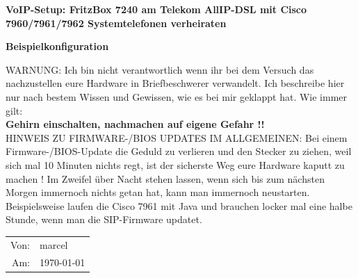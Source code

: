 \documentclass[a4paper,12pt]{scrbook}
\begin{document}
\begin{titlepage}

\begin{center}
{\huge\bfseries VoIP-Setup: FritzBox 7240 am Telekom AllIP-DSL mit Cisco 7960/7961/7962 Systemtelefonen verheiraten\par}
\vskip 1cm
\textbf{Beispielkonfiguration}

WARNUNG: Ich bin nicht verantwortlich wenn ihr bei dem Versuch das nachzustellen eure Hardware in Briefbeschwerer verwandelt. Ich
beschreibe hier nur nach bestem Wissen und Gewissen, wie es bei mir geklappt hat. Wie immer gilt:\\


\textbf{Gehirn einschalten, nachmachen auf eigene Gefahr !!}\\


HINWEIS ZU FIRMWARE-/BIOS UPDATES IM ALLGEMEINEN: Bei einem Firmware-/BIOS-Update die Geduld zu verlieren und den Stecker zu ziehen,
weil sich mal 10 Minuten nichts regt, ist der sicherste Weg eure Hardware kaputt zu machen ! Im Zweifel über Nacht stehen lassen, wenn
sich bis zum nächsten Morgen immernoch nichts getan hat, kann man immernoch neustarten. Beispielsweise laufen die Cisco 7961 mit Java und
brauchen locker mal eine halbe Stunde, wenn man die SIP-Firmware updatet. 

\end{center}
 
 \vfill
\vskip 3cm
\flushleft
\begin{tabular}{rl}
Von: & marcel\\ 
Am: & \today\\
\end{tabular}
\end{titlepage}

\tableofcontents

\listoffigures



\lstlistoflistings

 
\clearpage
 
\onehalfspacing
 
 \renewcommand{\figurename}{Abb.}
\end{document}
